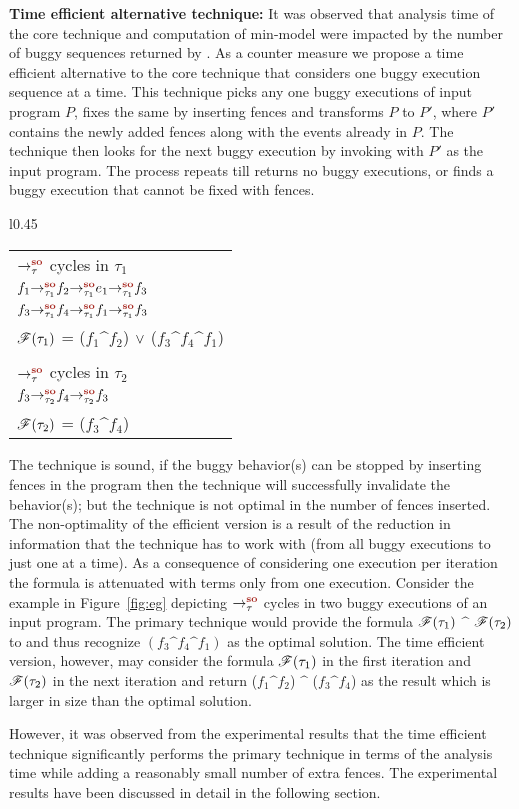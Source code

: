 {\bf Time efficient alternative technique:} It was observed that analysis
time of the core technique and \z computation of min-model were impacted
by the number of buggy sequences returned by \cds.
%
As a counter measure we propose a time efficient alternative to the core 
technique that considers one buggy execution sequence at a time.
%
This technique picks any one buggy executions of input program $P$,
fixes the same by inserting \sc fences and  transforms $P$ to $P'$,
where $P'$ contains the newly added \sc fences along with the events already
in $P$. 
%
The technique then looks for the next buggy execution by invoking \cds 
with $P'$ as the input program. 
The process repeats till \cds returns no buggy executions, or
finds a buggy execution that cannot be fixed with \sc fences.

\begin{wrapfigure}{l}{0.45\textwidth}
	\begin{tabular}{|l|}
		\hline
		$\setSO$ cycles in $\tau_1$\\
		\tab$\so{\tau_1}{\so{\tau_1}{\so{\tau_1}{f_1}{f_2}}{e_1}}{f_3}$\\
		\tab$\so{\tau_1}{\so{\tau_1}{\so{\tau_1}{f_3}{f_4}}{f_1}}{f_3}$\\
		$\mathscr{F}(\tau_1)$ = ($f_1 \^ f_2$) $\vee$ ($f_3 \^ f_4 \^ f_1$)\\
		\\
		$\setSO$ cycles in $\tau_2$\\
		\tab$\so{\tau_2}{\so{\tau_2}{f_3}{f_4}}{f_3}$\\
		$\mathscr{F}(\tau_2)$ = ($f_3 \^ f_4$)\\
		\hline
	\end{tabular}
	\caption{example showing non-optimality of the efficient version }
	\label{fig:eg}
\end{wrapfigure}

The technique is sound, \ie if the buggy behavior(s) can be stopped by 
inserting \sc fences in the program then the technique will successfully
invalidate the behavior(s);
but the technique is not optimal in the number of fences inserted.
The non-optimality of the efficient version is a result of the reduction
in information that the technique has to work with (from all buggy executions
to just one at a time). As a consequence of considering one execution per
iteration the \z formula is attenuated with terms only from one execution.
%
Consider the example in Figure~\ref{fig:eg} depicting $\setSO$ cycles in two buggy 
executions of an input program. The primary \ourtechnique technique
would provide the formula $\mathscr{F}(\tau_1)$ $\^$ $\mathscr{F}(\tau_2)$ to 
\z and thus recognize $(f_3 \^ f_4 \^ f_1)$ as the optimal solution.
The time efficient version, however, may consider the formula 
$\mathscr{F}(\tau_1)$ in the first iteration and $\mathscr{F}(\tau_2)$ in the
next iteration and return  ($f_1 \^ f_2$) $\^$ ($f_3 \^ f_4$) as the
result which is larger in size than the optimal solution.

However, it was observed from the experimental results that the time
efficient technique significantly performs the primary technique in terms of 
the analysis time while adding a reasonably small number of extra \sc
fences. The experimental results have been discussed in detail in the 
following section.